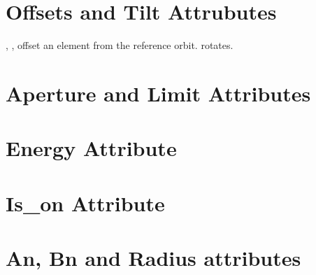 \section{Offsets and Tilt Attrubutes}
\label{s:offset}

, ,  offset an element from the reference orbit.
 rotates.

\section{Aperture and Limit Attributes}
\label{s:limit}

\section{Energy Attribute}
\label{s:energy}

\section{Is\_on Attribute}
\label{s:is_on}

\section{An, Bn and Radius attributes}
\label{s:ab}
